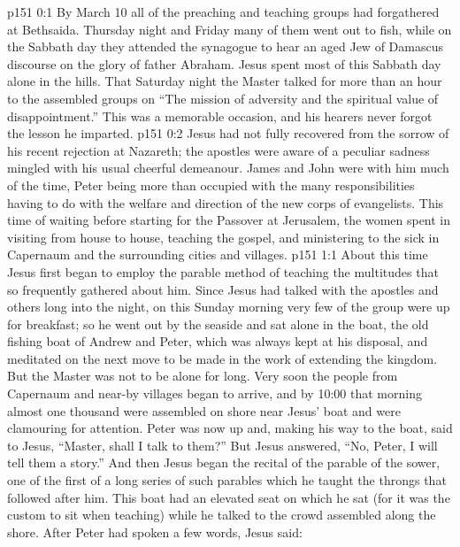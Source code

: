 \author{Midwayer Commission}
\vs p151 0:1 By March 10 all of the preaching and teaching groups had forgathered at Bethsaida. Thursday night and Friday many of them went out to fish, while on the Sabbath day they attended the synagogue to hear an aged Jew of Damascus discourse on the glory of father Abraham. Jesus spent most of this Sabbath day alone in the hills. That Saturday night the Master talked for more than an hour to the assembled groups on “The mission of adversity and the spiritual value of disappointment.” This was a memorable occasion, and his hearers never forgot the lesson he imparted.
\vs p151 0:2 Jesus had not fully recovered from the sorrow of his recent rejection at Nazareth; the apostles were aware of a peculiar sadness mingled with his usual cheerful demeanour. James and John were with him much of the time, Peter being more than occupied with the many responsibilities having to do with the welfare and direction of the new corps of evangelists. This time of waiting before starting for the Passover at Jerusalem, the women spent in visiting from house to house, teaching the gospel, and ministering to the sick in Capernaum and the surrounding cities and villages.
\vs p151 1:1 About this time Jesus first began to employ the parable method of teaching the multitudes that so frequently gathered about him. Since Jesus had talked with the apostles and others long into the night, on this Sunday morning very few of the group were up for breakfast; so he went out by the seaside and sat alone in the boat, the old fishing boat of Andrew and Peter, which was always kept at his disposal, and meditated on the next move to be made in the work of extending the kingdom. But the Master was not to be alone for long. Very soon the people from Capernaum and near-by villages began to arrive, and by 10:00 that morning almost one thousand were assembled on shore near Jesus’ boat and were clamouring for attention. Peter was now up and, making his way to the boat, said to Jesus, “Master, shall I talk to them?” But Jesus answered, “No, Peter, I will tell them a story.” And then Jesus began the recital of the parable of the sower, one of the first of a long series of such parables which he taught the throngs that followed after him. This boat had an elevated seat on which he sat (for it was the custom to sit when teaching) while he talked to the crowd assembled along the shore. After Peter had spoken a few words, Jesus said:
